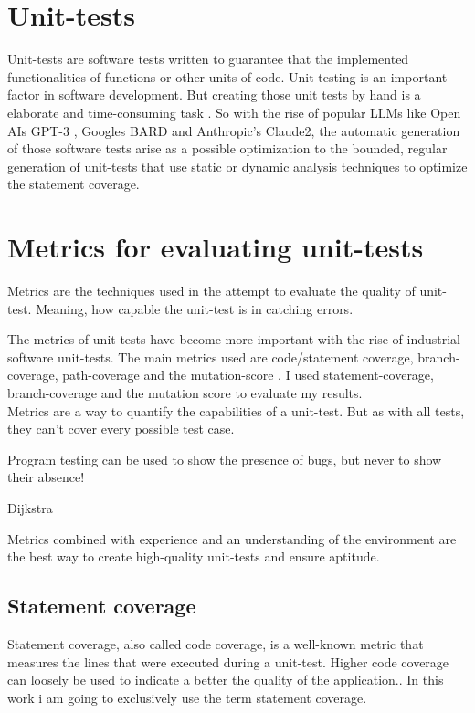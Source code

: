 \documentclass[a4paper,11pt,oneside]{memoir}
\begin{document}
\section{Unit-tests}
Unit-tests are software tests written to guarantee that the implemented functionalities of functions or other units of code. Unit testing is an important factor in software development. But creating those unit tests by hand is a elaborate and time-consuming task\cite{Daka_unit_tests} \cite{UnitTestAdequacy}. So with the rise of popular LLMs like Open AIs GPT-3 \cite{brown2020languagemodelsfewshotlearners}, Googles BARD and Anthropic’s Claude2, the automatic generation of those software tests arise as a possible optimization to the bounded, regular generation of unit-tests that use static or dynamic analysis techniques to optimize the statement coverage\cite{OverviewUnitTestGeneration2013}. 

\section{Metrics for evaluating unit-tests}
\label{metricsForEvaluationOfUnitTest}
Metrics are the techniques used in the attempt to evaluate the quality of unit-test. Meaning, how capable the unit-test is in catching errors.

The metrics of unit-tests have become more important with the rise of industrial software unit-tests. The main metrics used are code/statement coverage, branch-coverage, path-coverage and the mutation-score \cite{UnitTestAdequacy}.
I used statement-coverage, branch-coverage and the mutation score to evaluate my results.
\\
Metrics are a way to quantify the capabilities of a unit-test. But as with all tests, they can't cover every possible test case. 

\epigraph{Program testing can be used to show the presence of bugs, but never to show their absence!}{Dijkstra } 

Metrics combined with experience and an understanding of the environment are the best way to create high-quality unit-tests and ensure aptitude\cite{citation needed}.

\subsection{Statement coverage}
Statement coverage, also called code coverage, is a well-known metric that measures the lines that were executed during a unit-test. Higher code coverage can loosely be used to indicate a better the quality of the application.\cite{taufiqurrahmanCodeCoverage}. In this work i am going to exclusively use the term statement coverage. 
\end{document}
